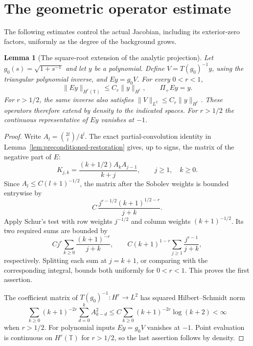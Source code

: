 \documentclass[11pt]{article}
\newtheorem{lemma}[proposition]{Lemma}
\newcommand{\T}{\mathbb T}
\begin{document}
\section{The geometric operator estimate}
The following estimates control the actual Jacobian, including its
exterior-zero factors, uniformly as the degree of the background grows.

\begin{lemma}[The square-root extension of the analytic projection]
\label{lem:endpoint-extension}
Let $g_0(s)=\sqrt{1+s^{-1}}$ and let $y$ be a polynomial. Define
$V=T(g_0)^{-1}y$, using the triangular polynomial inverse, and
$Ey=g_0V$. For every $0<r<1$,
\[
 \|Ey\|_{H^r(\T)}\le C_r\|y\|_{H^r},\qquad \Pi_+Ey=y.
\]
For $r>1/2$, the same inverse also satisfies
$\|V\|_{L^2}\le C_r\|y\|_{H^r}$.
These operators therefore extend by density to the indicated spaces.
For $r>1/2$ the continuous representative of $Ey$ vanishes at $-1$.
\end{lemma}
\begin{proof}
Write $A_l=\binom{2l}{l}/4^l$. The exact partial-convolution identity
in Lemma~\ref{lem:preconditioned-restoration} gives, up to signs, the
matrix of the negative part of $E$:
\[
 K_{j,k}=\frac{(k+1/2)A_kA_{j-1}}{k+j},
 \qquad j\ge1,\quad k\ge0.
\]
Since $A_l\le C(l+1)^{-1/2}$, the matrix after the Sobolev weights
is bounded entrywise by
\[
 C\,\frac{j^{r-1/2}(k+1)^{1/2-r}}{j+k}.
\]
Apply Schur's test with row weights $j^{-1/2}$ and column weights
$(k+1)^{-1/2}$. Its two required sums are bounded by
\[
 Cj^r\sum_{k\ge0}\frac{(k+1)^{-r}}{j+k},
 \qquad
 C(k+1)^{1-r}\sum_{j\ge1}\frac{j^{r-1}}{j+k},
\]
respectively. Splitting each sum at $j=k+1$, or comparing with
the corresponding integral, bounds both uniformly for $0<r<1$.
This proves the first assertion.

The coefficient matrix of $T(g_0)^{-1}:H^r\to L^2$ has squared
Hilbert--Schmidt norm
\[
 \sum_{k\ge0}(k+1)^{-2r}\sum_{d=0}^k A_{k-d}^2
 \le C\sum_{k\ge0}(k+1)^{-2r}\log(k+2)<\infty
\]
when $r>1/2$. For polynomial inputs $Ey=g_0V$ vanishes at $-1$.
Point evaluation is continuous on $H^r(\T)$ for $r>1/2$,
so the last assertion follows by density.
\end{proof}
\end{document}
